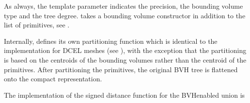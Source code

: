 \documentclass[letterpaper,10pt,english]{sphinxmanual}
\begin{document}
\begin{sphinxVerbatim}[commandchars=\\\{\}]
        

    

   

   

   
\end{sphinxVerbatim}

\sphinxAtStartPar
As always, the template parameter  indicates the precision,  the bounding volume type and  the tree degree.
 takes a bounding volume constructor in addition to the list of primitives, see {\hyperref[\detokenize{ImplemBVH:chap-bvhconstruction}]{}}.

\sphinxAtStartPar
Internally,  defines its own partitioning function which is identical to the implementation for DCEL meshes (see {\hyperref[\detokenize{ImplemDCEL:chap-bvhintegration}]{}}), with the exception that the partitioning is based on the centroids of the bounding volumes rather than the centroid of the primitives.
After partitioning the primitives, the original BVH tree is flattened onto the compact representation.

\sphinxAtStartPar
The implementation of the signed distance function for the BVH\sphinxhyphen{}enabled union is
\end{document}
